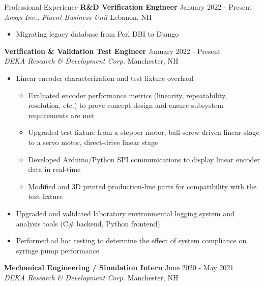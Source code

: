\begin{rSection}{Professional Experience}
    {\bf R\&D Verification Engineer} \hfill {January 2022 - Present}
    \\{\em Ansys Inc., Fluent Business Unit} \hfill {Lebanon, NH}
    \vspace{-0.5em}
    \begin{itemize}[label={\tiny\raisebox{1ex}{\textbullet}}, noitemsep]
        \item Migrating legacy database from Perl DBI to Django
    \end{itemize}
    \vspace{-0.4em}
    {\bf Verification \& Validation Test Engineer} \hfill {January 2022 - Present}
    \\{\em DEKA Research \& Development Corp.} \hfill {Manchester, NH}
    \vspace{-0.5em}
    \begin{itemize}[label={\tiny\raisebox{1ex}{\textbullet}}, noitemsep]
        \item Linear encoder characterization and test fixture overhaul
        \begin{itemize}[label={\tiny\raisebox{1ex}{\textbullet}}, noitemsep]
            \item Evaluated encoder performance metrics (linearity, repeatability, resolution, etc.) to prove concept design and ensure subsystem requirements are met
            \item Upgraded test fixture from a stepper motor, ball-screw driven linear stage to a servo motor, direct-drive linear stage
            \item Developed Arduino/Python SPI communications to display linear encoder data in real-time
            \item Modified and 3D printed production-line parts for compatibility with the test fixture
        \end{itemize}
        \item Upgraded and validated laboratory environmental logging system and analysis tools (C# backend, Python frontend)
        \item Performed ad hoc testing to determine the effect of system compliance on syringe pump performance
    \end{itemize}
    \vspace{-0.4em}
    {\bf Mechanical Engineering / Simulation Intern} \hfill {June 2020 - May 2021}
    \\ {\em DEKA Research \& Development Corp.} \hfill {Manchester, NH}

\end{rSection}
